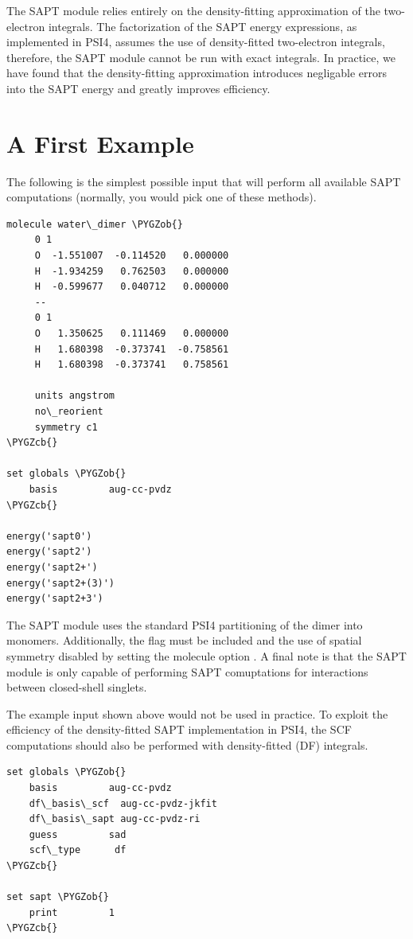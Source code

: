 \documentclass[letterpaper,10pt,english]{sphinxmanual}
\def\PYGZob{\char`\{}
\def\PYGZcb{\char`\}}
\begin{document}
The SAPT module relies entirely on the density-fitting approximation
of the two-electron integrals. The factorization of the SAPT energy
expressions, as implemented in PSI4, assumes the use of density-fitted
two-electron integrals, therefore, the SAPT module cannot be run with
exact integrals. In practice, we have found that the density-fitting
approximation introduces negligable errors into the SAPT energy and greatly
improves efficiency.


\section{A First Example}
\label{index:a-first-example}
The following is the simplest possible input that will perform all
available SAPT computations (normally, you would pick one of these methods).

\begin{Verbatim}[commandchars=\\\{\}]
molecule water\_dimer \PYGZob{}
     0 1
     O  -1.551007  -0.114520   0.000000
     H  -1.934259   0.762503   0.000000
     H  -0.599677   0.040712   0.000000
     --
     0 1
     O   1.350625   0.111469   0.000000
     H   1.680398  -0.373741  -0.758561
     H   1.680398  -0.373741   0.758561

     units angstrom
     no\_reorient
     symmetry c1
\PYGZcb{}

set globals \PYGZob{}
    basis         aug-cc-pvdz
\PYGZcb{}

energy('sapt0')
energy('sapt2')
energy('sapt2+')
energy('sapt2+(3)')
energy('sapt2+3')
\end{Verbatim}

The SAPT module uses the standard PSI4 partitioning of the dimer
into monomers. Additionally, the  flag must be included
and the use of spatial symmetry disabled by setting the molecule option
. A final note is that the SAPT module is only
capable of performing SAPT comuptations for interactions between closed-shell
singlets.

The example input shown above would not be used in practice.
To exploit the efficiency of the density-fitted SAPT implementation in
PSI4, the SCF computations should also be performed with density-fitted
(DF) integrals.

\begin{Verbatim}[commandchars=\\\{\}]
set globals \PYGZob{}
    basis         aug-cc-pvdz
    df\_basis\_scf  aug-cc-pvdz-jkfit
    df\_basis\_sapt aug-cc-pvdz-ri
    guess         sad
    scf\_type      df
\PYGZcb{}

set sapt \PYGZob{}
    print         1
\PYGZcb{}
\end{Verbatim}
\end{document}
